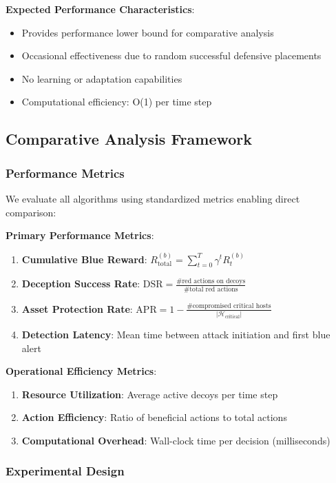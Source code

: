 \documentclass[12pt,oneside]{article}
\begin{document}
\textbf{Expected Performance Characteristics}:
\begin{itemize}
    \item Provides performance lower bound for comparative analysis
    \item Occasional effectiveness due to random successful defensive placements
    \item No learning or adaptation capabilities
    \item Computational efficiency: O(1) per time step
\end{itemize}

\subsection{Comparative Analysis Framework}

\subsubsection{Performance Metrics}

We evaluate all algorithms using standardized metrics enabling direct comparison:

\textbf{Primary Performance Metrics}:
\begin{enumerate}
    \item \textbf{Cumulative Blue Reward}: $R_{\text{total}}^{(b)} = \sum_{t=0}^{T} \gamma^t R_t^{(b)}$
    \item \textbf{Deception Success Rate}: $\text{DSR} = \frac{\text{\# red actions on decoys}}{\text{\# total red actions}}$
    \item \textbf{Asset Protection Rate}: $\text{APR} = 1 - \frac{\text{\# compromised critical hosts}}{|\mathcal{H}_{\text{critical}}|}$
    \item \textbf{Detection Latency}: Mean time between attack initiation and first blue alert
\end{enumerate}

\textbf{Operational Efficiency Metrics}:
\begin{enumerate}
    \item \textbf{Resource Utilization}: Average active decoys per time step
    \item \textbf{Action Efficiency}: Ratio of beneficial actions to total actions
    \item \textbf{Computational Overhead}: Wall-clock time per decision (milliseconds)
\end{enumerate}

\subsubsection{Experimental Design}
\end{document}
